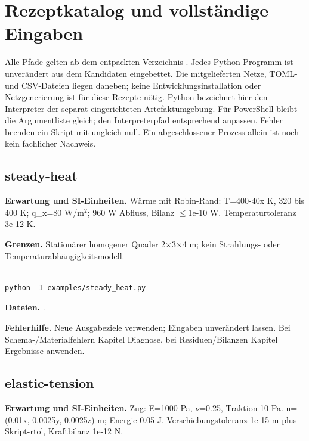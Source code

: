 \chapter{Rezeptkatalog und vollständige Eingaben}\label{sec:app-recipes}

Alle Pfade gelten ab dem entpackten Verzeichnis . Jedes Python-Programm ist unverändert aus dem Kandidaten eingebettet. Die mitgelieferten Netze, TOML- und CSV-Dateien liegen daneben; keine Entwicklungsinstallation oder Netzgenerierung ist für diese Rezepte nötig. Python bezeichnet hier den Interpreter der separat eingerichteten Artefaktumgebung. Für PowerShell bleibt die Argumentliste gleich; den Interpreterpfad entsprechend anpassen. Fehler beenden ein Skript mit ungleich null. Ein abgeschlossener Prozess allein ist noch kein fachlicher Nachweis.


\section{steady-heat}\label{recipe:steady-heat}

\textbf{Erwartung und SI-Einheiten.} Wärme mit Robin-Rand: T=400-40x K, 320 bis 400 K; q\_x=80 W/m$^2$; 960 W Abfluss, Bilanz $\leq$1e-10 W. Temperaturtoleranz 3e-12 K.

\textbf{Grenzen.} Stationärer homogener Quader 2$\times$3$\times$4 m; kein Strahlungs- oder Temperaturabhängigkeitsmodell.

\begin{lstlisting}

python -I examples/steady_heat.py

\end{lstlisting}

\textbf{Dateien.} .

\textbf{Fehlerhilfe.} Neue Ausgabeziele verwenden; Eingaben unverändert lassen. Bei Schema-/Materialfehlern Kapitel Diagnose, bei Residuen/Bilanzen Kapitel Ergebnisse anwenden.



\section{elastic-tension}\label{recipe:elastic-tension}

\textbf{Erwartung und SI-Einheiten.} Zug: E=1000 Pa, $\nu$=0.25, Traktion 10 Pa. u=(0.01x,-0.0025y,-0.0025z) m; Energie 0.05 J. Verschiebungstoleranz 1e-15 m plus Skript-rtol, Kraftbilanz 1e-12 N.

